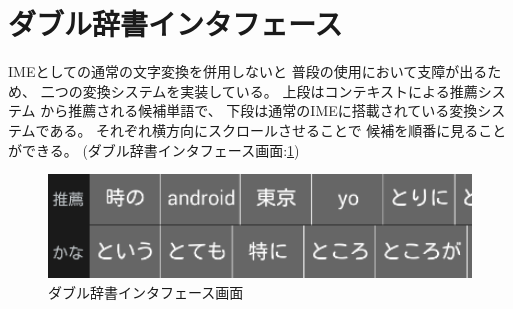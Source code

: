 \section{ダブル辞書インタフェース}
IMEとしての通常の文字変換を併用しないと
普段の使用において支障が出るため、
二つの変換システムを実装している。
上段はコンテキストによる推薦システム
から推薦される候補単語で、
下段は通常のIMEに搭載されている変換システムである。
それぞれ横方向にスクロールさせることで
候補を順番に見ることができる。
(ダブル辞書インタフェース画面:\ref{fig:doubledic})
\begin{figure}[htbp]
  \begin{center}
    \includegraphics[width=120mm,bb=0 0 387 95]{images/doubledic.png}
  \end{center}
  \label{fig:doubledic}
  \caption{ダブル辞書インタフェース画面}
\end{figure}

